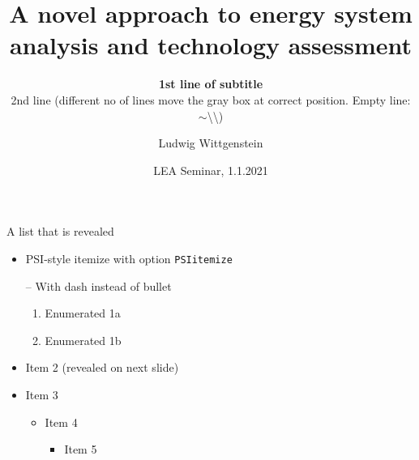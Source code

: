 \documentclass[aspectratio=169]{beamer}
\begin{document}
\title{A novel approach to energy system analysis and technology assessment}

\author[L.~Wittgenstein]{Ludwig Wittgenstein}


\subtitle{\textbf{1st line of subtitle}\\2nd line (different no of lines move the gray box at correct position. Empty line:  $\sim$\textbackslash\textbackslash)}

\date{LEA Seminar, 1.1.2021} %


\begin{frame}[plain] %
  \titlepage
\end{frame}


\begin{frame}[t]{A list that is revealed}
   \PSIvspace
  \begin{itemize}
  \item PSI-style itemize with option \texttt{PSIitemize}
  \item[--]  With dash instead of bullet
    \begin{enumerate}
    \item Enumerated 1a
    \item Enumerated 1b
    \end{enumerate}
    \pause
  \item Item 2 (revealed on next slide)
    \pause
  \item Item 3
    \begin{itemize}
    \item Item 4
      \begin{itemize}
      \item Item 5
      \end{itemize}
    \end{itemize}
  \end{itemize}
\end{frame}
\end{document}
